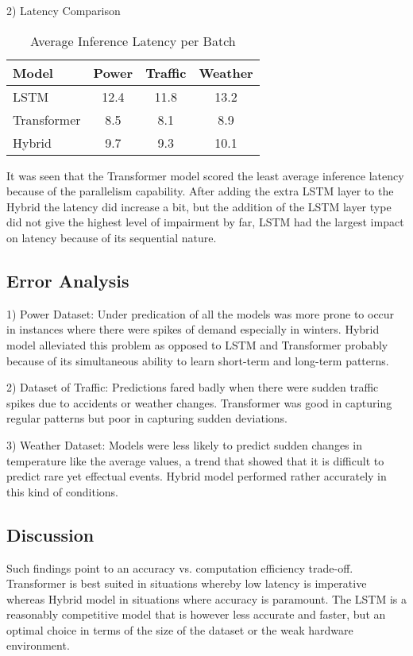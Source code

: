 \documentclass[conference]{IEEEtran}
\begin{document}
2) Latency Comparison
\begin{table}[htbp]
\caption{Average Inference Latency per Batch}
\centering
\begin{tabular}{lccc}
\toprule
\textbf{Model} & \textbf{Power} & \textbf{Traffic} & \textbf{Weather} \\
\midrule
LSTM \cite{hochreiter1997lstm}         & 12.4 & 11.8 & 13.2 \\
Transformer \cite{vaswani2017attention}  & 8.5 & 8.1 & 8.9 \\
Hybrid \cite{wu2020deep}       & 9.7 & 9.3 & 10.1 \\
\bottomrule
\end{tabular}
\end{table}

It was seen that the Transformer \cite{vaswani2017attention} model scored the least average inference latency because of the parallelism capability. After adding the extra LSTM \cite{hochreiter1997lstm} layer to the Hybrid \cite{wu2020deep} the latency did increase a bit, but the addition of the LSTM \cite{hochreiter1997lstm} layer type did not give the highest level of impairment by far, LSTM \cite{hochreiter1997lstm} had the largest impact on latency because of its sequential nature.

\subsection{Error Analysis}
1) Power Dataset:
Under predication of all the models was more prone to occur in instances where there were spikes of demand especially in winters. Hybrid \cite{wu2020deep} model alleviated this problem as opposed to LSTM \cite{hochreiter1997lstm} and Transformer \cite{vaswani2017attention} probably because of its simultaneous ability to learn short-term and long-term patterns.

2) Dataset of Traffic:
Predictions fared badly when there were sudden traffic spikes due to accidents or weather changes. Transformer \cite{vaswani2017attention} was good in capturing regular patterns but poor in capturing sudden deviations.

3) Weather Dataset:
Models were less likely to predict sudden changes in temperature like the average values, a trend that showed that it is difficult to predict rare yet effectual events. Hybrid \cite{wu2020deep} model performed rather accurately in this kind of conditions.
\subsection{Discussion}
Such findings point to an accuracy vs. computation efficiency trade-off. Transformer \cite{vaswani2017attention} is best suited in situations whereby low latency is imperative whereas Hybrid \cite{wu2020deep} model in situations where accuracy is paramount. The LSTM \cite{hochreiter1997lstm} is a reasonably competitive model that is however less accurate and faster, but an optimal choice in terms of the size of the dataset or the weak hardware environment.
\end{document}
